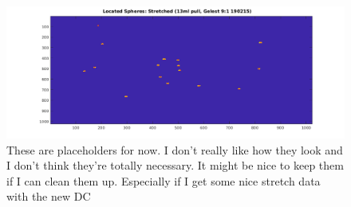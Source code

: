 \begin{figure}[h!]
	\centering
	\includegraphics[width=\linewidth]{Chapters/Figures/13ml_stretched_2D_located}
	\caption[Stretched]{These are placeholders for now. I don't really like how they look and I don't think they're totally necessary. It might be nice to keep them if I can clean them up. Especially if I get some nice stretch data with the new DC}
	\label{fig:13mlstretched2dlocated}
\end{figure}

%
